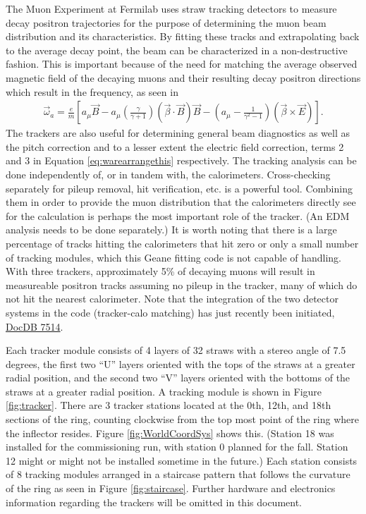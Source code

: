   The Muon \gmtwo Experiment at Fermilab uses straw tracking detectors to measure decay positron trajectories for the purpose of determining the muon beam distribution and its characteristics. By fitting these tracks and extrapolating back to the average decay point, the beam can be characterized in a non-destructive fashion. This is important because of the need for matching the average observed magnetic field of the decaying muons and their resulting decay positron directions which result in the \wa frequency, as seen in
        \begin{align} \label{eq:warearrangethis}
            \vec{\omega}_{a} = \frac{e}{m} [a_{\mu}\vec{B} - a_{\mu} (\frac{\gamma}{\gamma+1})(\vec{\beta} \cdot \vec{B})\vec{B} - (a_{\mu} - \frac{1}{\gamma^{2}-1})(\vec{\beta} \times \vec{E}) ].
        \end{align}
  The trackers are also useful for determining general beam diagnostics as well as the pitch correction and to a lesser extent the electric field correction, terms 2 and 3 in Equation \ref{eq:warearrangethis} respectively. The tracking analysis can be done independently of, or in tandem with, the calorimeters. Cross-checking separately for pileup removal, hit verification, etc. is a powerful tool. Combining them in order to provide the muon distribution that the calorimeters directly see for the \wa calculation is perhaps the most important role of the tracker. (An EDM analysis needs to be done separately.) It is worth noting that there is a large percentage of tracks hitting the calorimeters that hit zero or only a small number of tracking modules, which this Geane fitting code is not capable of handling. With three trackers, approximately 5\% of decaying muons will result in measureable positron tracks assuming no pileup in the tracker, many of which do not hit the nearest calorimeter. Note that the integration of the two detector systems in the code (tracker-calo matching) has just recently been initiated, \href{https://gm2-docdb.fnal.gov/cgi-bin/private/ShowDocument?docid=7514}{DocDB 7514}.

  Each tracker module consists of 4 layers of 32 straws with a stereo angle of 7.5 degrees, the first two ``U'' layers oriented with the tops of the straws at a greater radial position, and the second two ``V'' layers oriented with the bottoms of the straws at a greater radial position. A tracking module is shown in Figure \ref{fig:tracker}. There are 3 tracker stations located at the 0th, 12th, and 18th sections of the ring, counting clockwise from the top most point of the ring where the inflector resides. Figure \ref{fig:WorldCoordSys} shows this. (Station 18 was installed for the commissioning run, with station 0 planned for the fall. Station 12 might or might not be installed sometime in the future.) Each station consists of 8 tracking modules arranged in a staircase pattern that follows the curvature of the ring as seen in Figure \ref{fig:staircase}. Further hardware and electronics information regarding the trackers will be omitted in this document.

